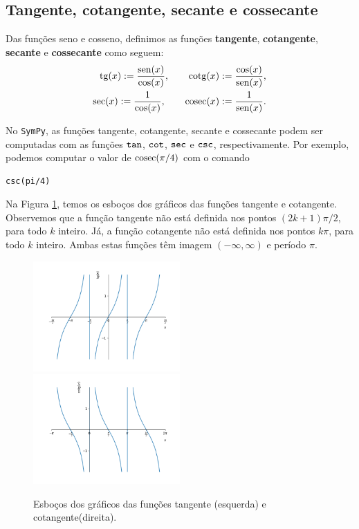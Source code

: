 \subsection{Tangente, cotangente, secante e cossecante}

Das funções seno e cosseno, definimos as funções {\bf tangente}, {\bf cotangente}, {\bf secante} e {\bf cossecante} como seguem:
\begin{align}
  \operatorname{tg}(x) := \frac{\operatorname{sen}(x)}{\cos(x)},\qquad \operatorname{cotg}(x) := \frac{\cos(x)}{\operatorname{sen}(x)},\\
  \sec(x) := \frac{1}{\cos(x)},\qquad \operatorname{cosec}(x) := \frac{1}{\operatorname{sen}(x)}.
\end{align}

\ifispython
No \verb+SymPy+, as funções tangente, cotangente, secante e cossecante podem ser computadas com as funções $\verb+tan+$, $\verb+cot+$, $\verb+sec+$ e $\verb+csc+$, respectivamente. Por exemplo, podemos computar o valor de $\operatorname{cosec}(\pi/4)$ com o comando
\begin{verbatim}
csc(pi/4)
\end{verbatim}
\fi

Na Figura \ref{fig:co_tg_graficos}, temos os esboços dos gráficos das funções tangente e cotangente. Observemos que a função tangente não está definida nos pontos $(2k+1)\pi/2$, para todo $k$ inteiro. Já, a função cotangente não está definida nos pontos $k\pi$, para todo $k$ inteiro. Ambas estas funções têm imagem $(-\infty, \infty)$ e período $\pi$.

\begin{figure}[H]
  \centering
  \includegraphics[width=0.5\textwidth]{./cap_funcao/dados/fig_co_tg_graficos/fig_tg_grafico}~
  \includegraphics[width=0.5\textwidth]{./cap_funcao/dados/fig_co_tg_graficos/fig_cotg_grafico}
  \caption{Esboços dos gráficos das funções tangente (esquerda) e cotangente(direita).}
  \label{fig:co_tg_graficos}
\end{figure}

